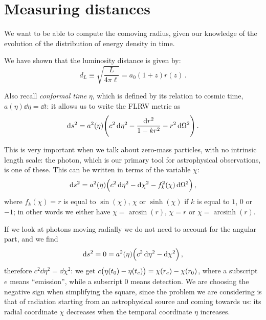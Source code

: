 \documentclass[main.tex]{subfiles}
\begin{document}


\section{Measuring distances} 

We want to be able to compute the comoving radius, given our knowledge of the evolution of the distribution of energy density in time.

We have shown that the luminosity distance is given by:
%
\begin{equation}
  d_L \equiv \sqrt{\frac{L}{4 \pi \ell}}
  = a_0 (1+z) r(z)
\,.
\end{equation}

Also recall \emph{conformal time} \(\eta\), which is defined by its relation to cosmic time, \(a(\eta ) \dd{\eta} = \dd{t}\): it allows us to write the FLRW metric as
%
\begin{equation}
  \dd{s^2} = a^2(\eta ) \qty(c^2 \dd{\eta^2} - \frac{\dd{r^2} }{1 - k r^2} - r^2 \dd{\Omega^2} )
\,.
\end{equation}

This is very important when we talk about zero-mass particles, with no intrinsic length scale: the photon, which is our primary tool for astrophysical observations, is one of these.
This can be written in terms of the variable \(\chi\): 
%
\begin{equation}
  \dd{s^2}  = a^2(\eta ) \qty(c^2 \dd{\eta^2} - \dd{\chi^2} - f^2_k (\chi ) \dd{\Omega^2})
\,,
\end{equation}
%
where \(f_k(\chi )=r\) is equal to \(\sin(\chi ) \), \(\chi \) or \(\sinh(\chi )\) if \(k\) is equal to \(1\), \(0\) or \(-1\); in other words we either have \(\chi = \arcsin(r)\), \(\chi = r\) or \(\chi = \operatorname{arcsinh}(r)\).

If we look at photons moving radially we do not need to account for the angular part, and we find
%
\begin{equation}
  \dd{s^2} = 0 = a^2(\eta ) \qty(c^2 \dd{\eta^2} - \dd{\chi^2})
\,,
\end{equation}
%
therefore \(c^2 \dd{\eta^2} = \dd{\chi^2}\):  we get \(c \qty(\eta (t_0 ) - \eta (t_e)) = \chi (r_e) - \chi (r_0 )\), where a subscript \(e\) means ``emission'', while a subscript \(0\) means detection. 
We are choosing the negative sign when simplifying the square, since the problem we are considering is that of radiation starting from an astrophysical source and coming towards us: its radial coordinate \(\chi \) decreases when the temporal coordinate \(\eta \) increases. 
\end{document}
